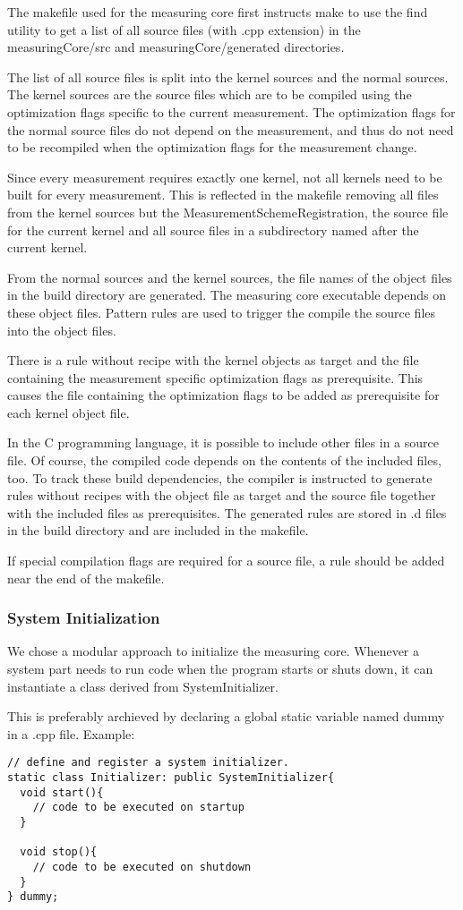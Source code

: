 \documentclass[a4paper,12pt]{article}
\newcommand{\file}[1]{}
\begin{document}
The makefile used for the measuring core first instructs make to use the find utility to get a list of all source files (with .cpp extension) in the measuringCore/src and measuringCore/generated directories.

The list of all source files is split into the kernel sources and the normal sources. The kernel sources are the source files which are to be compiled using the optimization flags specific to the current measurement. The optimization flags for the normal source files do not depend on the measurement, and thus do not need to be recompiled when the optimization flags for the measurement change.

Since every measurement requires exactly one kernel, not all kernels need to be built for every measurement. This is reflected in the makefile removing all files from the kernel sources but the MeasurementSchemeRegistration, the source file for the current kernel and all source files in a subdirectory named after the current kernel.

From the normal sources and the kernel sources, the file names of the object files in the build directory are generated. The measuring core executable depends on these object files. Pattern rules are used to trigger the compile the source files into the object files.

There is a rule without recipe with the kernel objects as target and the file containing the measurement specific optimization flags as prerequisite. This causes the file containing the optimization flags to be added as prerequisite for each kernel object file.

In the C programming language, it is possible to include other files in a source file. Of course, the compiled code depends on the contents of the included files, too. To track these build dependencies, the compiler is instructed to generate rules without recipes with the object file as target and the source file together with the included files as prerequisites. The generated rules are stored in .d files in the build directory and are included in the makefile.

If special compilation flags are required for a source file, a rule should be added near the end of the makefile.

\subsubsection{System Initialization}
We chose a modular approach to initialize the measuring core. Whenever a system part needs to run code when the program starts or shuts down, it can instantiate a class derived from SystemInitializer.
\file{measuringCore/baseClasses/SystemInitializer.h}
This is preferably archieved by declaring a global static variable named dummy in a .cpp file. Example:
\begin{verbatim}
// define and register a system initializer.
static class Initializer: public SystemInitializer{
  void start(){
    // code to be executed on startup
  }

  void stop(){
    // code to be executed on shutdown
  }
} dummy;
\end{verbatim}
\end{document}
